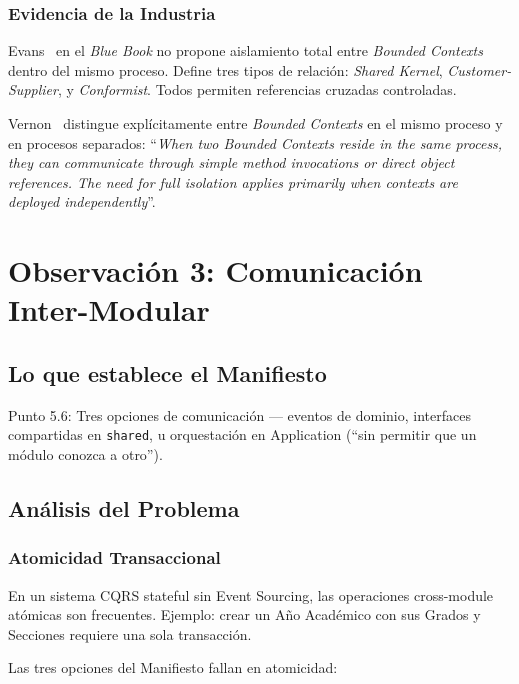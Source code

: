 \documentclass[conference]{IEEEtran}
\begin{document}
\subsubsection{Evidencia de la Industria}

Evans~\cite{evans2003} en el \textit{Blue Book} no propone aislamiento total entre \textit{Bounded Contexts} dentro del mismo proceso. Define tres tipos de relaci\'on: \textit{Shared Kernel}, \textit{Customer-Supplier}, y \textit{Conformist}. Todos permiten referencias cruzadas controladas.

Vernon~\cite{vernon2013} distingue expl\'icitamente entre \textit{Bounded Contexts} en el mismo proceso y en procesos separados: ``\textit{When two Bounded Contexts reside in the same process, they can communicate through simple method invocations or direct object references. The need for full isolation applies primarily when contexts are deployed independently}''.


\section{Observaci\'on 3: Comunicaci\'on Inter-Modular}
\label{sec:obs3}

\subsection{Lo que establece el Manifiesto}
Punto 5.6: Tres opciones de comunicaci\'on --- eventos de dominio, interfaces compartidas en \texttt{shared}, u orquestaci\'on en Application (``sin permitir que un m\'odulo conozca a otro'').

\subsection{An\'alisis del Problema}

\subsubsection{Atomicidad Transaccional}
En un sistema CQRS stateful sin Event Sourcing, las operaciones cross-module at\'omicas son frecuentes. Ejemplo: crear un A\~no Acad\'emico con sus Grados y Secciones requiere una sola transacci\'on.

Las tres opciones del Manifiesto fallan en atomicidad:
\end{document}
